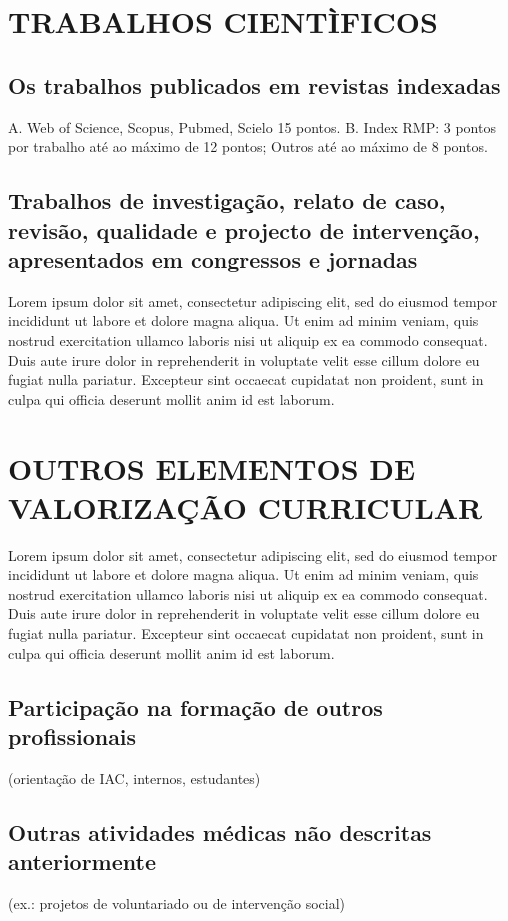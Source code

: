 \documentclass{report}
\begin{document}
\chapter{TRABALHOS CIENTÌFICOS}

\section{Os trabalhos publicados em revistas indexadas}
A. Web of Science, Scopus, Pubmed, Scielo 15 pontos.
B. Index RMP: 3
pontos por trabalho até ao máximo de 12 pontos; Outros até ao máximo de 8 pontos.

\section{Trabalhos de investigação, relato de caso, revisão, qualidade e projecto de intervenção, apresentados em congressos e jornadas}
Lorem ipsum dolor sit amet, consectetur adipiscing elit, sed do eiusmod tempor incididunt ut labore et dolore magna aliqua. Ut enim ad minim veniam, quis nostrud exercitation ullamco laboris nisi ut aliquip ex ea commodo consequat. Duis aute irure dolor in reprehenderit in voluptate velit esse cillum dolore eu fugiat nulla pariatur. Excepteur sint occaecat cupidatat non proident, sunt in culpa qui officia deserunt mollit anim id est laborum.

\chapter{OUTROS ELEMENTOS DE VALORIZAÇÃO CURRICULAR}
Lorem ipsum dolor sit amet, consectetur adipiscing elit, sed do eiusmod tempor incididunt ut labore et dolore magna aliqua. Ut enim ad minim veniam, quis nostrud exercitation ullamco laboris nisi ut aliquip ex ea commodo consequat. Duis aute irure dolor in reprehenderit in voluptate velit esse cillum dolore eu fugiat nulla pariatur. Excepteur sint occaecat cupidatat non proident, sunt in culpa qui officia deserunt mollit anim id est laborum.

\section{Participação na formação de outros profissionais}
(orientação de IAC, internos, estudantes)

\section{Outras atividades médicas não descritas anteriormente}
(ex.: projetos de voluntariado ou de intervenção social)
\end{document}
